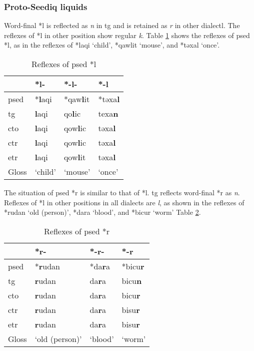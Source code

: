 \subsubsection{Proto-Seediq liquids}

Word-final *l is reflected as \textit{n} in \acl{tg} and is retained as \textit{r} in other dialectl. The reflexes of *l in other position show regular \textit{k}. Table \ref{tab:psed_l} shows the reflexes of \acl{psed} *l, as in the reflexes of *laqi `child', *qawlit `mouse', and *təxal `once'. 

\begin{table}[!htbp]
\centering
\caption{Reflexes of \acl{psed} *l}
\label{tab:psed_l}
\begin{tabular}{llll}
\hline
           & *l-     & *-l-    & *-l    \\ \hline
\acs{psed} & *\textbf{l}aqi   & *qaw\textbf{l}it & *təxa\textbf{l} \\
\acs{tg}   & \textbf{l}aqi    & qo\textbf{l}ic   & texa\textbf{n}  \\
\acs{cto}  & \textbf{l}aqi    & qow\textbf{l}ic  & təxa\textbf{l}  \\
\acs{ctr}  & \textbf{l}aqi    & qow\textbf{l}ic  & təxa\textbf{l}  \\
\acs{etr}  & \textbf{l}aqi    & qow\textbf{l}it  & təxa\textbf{l}  \\ \hline
Gloss      & `child' & `mouse' & `once' \\ \hline
\end{tabular}
\end{table}

The situation of \acl{psed} *r is similar to that of *l. \acl{tg} reflects word-final *r as \textit{n}. Reflexes of *l in other positions in all dialects are \textit{l}, as shown in the reflexes of *rudan `old (person)', *dara `blood', and *bicur `worm' Table \ref{tab:psed_r}. 

\begin{table}[!htbp]
\centering
\caption{Reflexes of \acl{psed} *r}
\label{tab:psed_r}
\begin{tabular}{llll}
\hline
           & *r-            & *-r-    & *-r    \\ \hline
\acs{psed} & *\textbf{r}udan         & *da\textbf{r}a   & *bicu\textbf{r} \\ \hdashline
\acs{tg}   & \textbf{r}udan          & da\textbf{r}a    & bicu\textbf{n}  \\
\acs{cto}  & \textbf{r}udan          & da\textbf{r}a    & bicu\textbf{r}  \\
\acs{ctr}  & \textbf{r}udan          & da\textbf{r}a    & bisu\textbf{r}  \\
\acs{etr}  & \textbf{r}udan          & da\textbf{r}a    & bisu\textbf{r}  \\ \hline
Gloss      & `old (person)' & `blood' & `worm' \\ \hline
\end{tabular}
\end{table}

